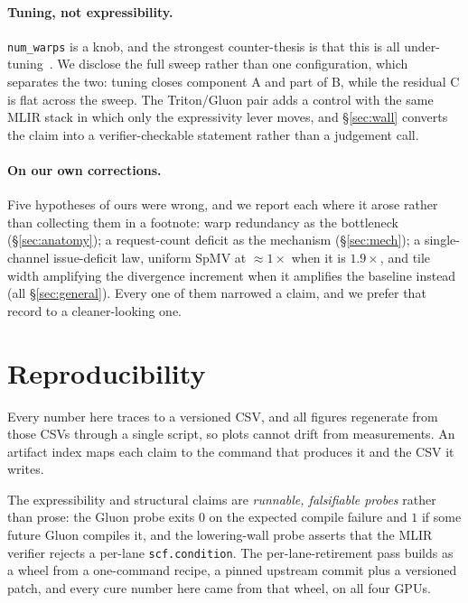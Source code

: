 \documentclass[sigplan,screen,review,anonymous]{acmart}
\begin{document}
\paragraph{Tuning, not expressibility.} \texttt{num\_warps} is a knob, and the strongest
counter-thesis is that this is all under-tuning~\cite{ringlein2025}. We disclose the full
sweep rather than one configuration, which separates the two: tuning closes component A and
part of B, while the residual C is flat across the sweep. The Triton/Gluon pair adds a
control with the same MLIR stack in which only the expressivity lever moves, and
\S\ref{sec:wall} converts the claim into a verifier-checkable statement rather than a
judgement call.

\paragraph{On our own corrections.} Five hypotheses of ours were wrong, and we report each
where it arose rather than collecting them in a footnote: warp redundancy as the bottleneck
(\S\ref{sec:anatomy}); a request-count deficit as the mechanism (\S\ref{sec:mech}); a
single-channel issue-deficit law, uniform SpMV at ${\approx}1\times$ when it is
$1.9\times$, and tile width amplifying the divergence increment when it amplifies the
baseline instead (all \S\ref{sec:general}). Every one of them narrowed a claim, and we
prefer that record to a cleaner-looking one.

\section{Reproducibility}\label{sec:repro}
Every number here traces to a versioned CSV, and all figures regenerate from those CSVs
through a single script, so plots cannot drift from measurements. An artifact index maps
each claim to the command that produces it and the CSV it writes.

The expressibility and structural claims are \emph{runnable, falsifiable probes} rather than
prose: the Gluon probe exits $0$ on the expected compile failure and $1$ if some future
Gluon compiles it, and the lowering-wall probe asserts that the MLIR verifier rejects a
per-lane \texttt{scf.condition}. The per-lane-retirement pass builds as a wheel from a
one-command recipe, a pinned upstream commit plus a versioned patch, and every cure number
here came from that wheel, on all four GPUs.
\end{document}
